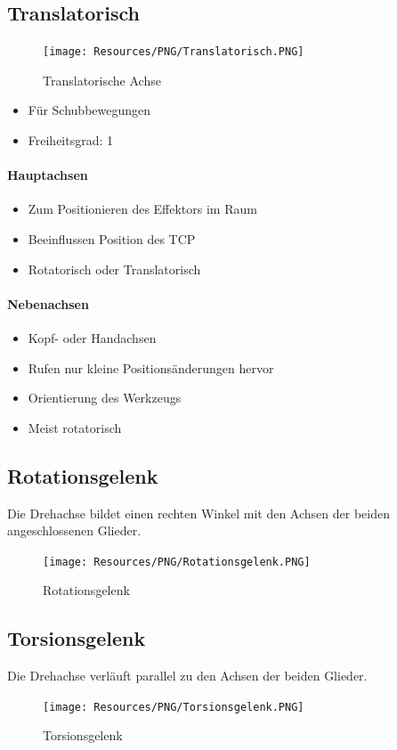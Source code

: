 \subsection{Translatorisch}
\begin{figure}[H]
	\begin{center}
		\texttt{[image: Resources/PNG/Translatorisch.PNG]}
		\caption{Translatorische Achse}
		\label{fig:PNG/Translatorisch.PNG}
	\end{center}
\end{figure}
\begin{itemize}
	\item Für Schubbewegungen
	\item Freiheitsgrad: 1
\end{itemize}
\paragraph{Hauptachsen}
\begin{itemize}
	\item Zum Positionieren des Effektors im Raum
	\item Beeinflussen Position des TCP
	\item Rotatorisch oder Translatorisch
\end{itemize}
\paragraph{Nebenachsen}
\begin{itemize}
	\item Kopf- oder Handachsen
	\item Rufen nur kleine Positionsänderungen hervor
	\item Orientierung des Werkzeugs
	\item Meist rotatorisch
\end{itemize}
\subsection{Rotationsgelenk}
Die Drehachse bildet einen rechten Winkel mit den Achsen der beiden angeschlossenen Glieder.
\begin{figure}[H]
	\begin{center}
		\texttt{[image: Resources/PNG/Rotationsgelenk.PNG]}
		\caption{Rotationsgelenk}
		\label{fig:Resources/PNG/Rotationsgelenk}
	\end{center}
\end{figure}
\subsection{Torsionsgelenk}
Die Drehachse verläuft parallel zu den Achsen der beiden Glieder.
\begin{figure}[H]
	\begin{center}
		\texttt{[image: Resources/PNG/Torsionsgelenk.PNG]}
		\caption{Torsionsgelenk}
		\label{fig:Resources/PNG/Torsionsgelenk}
	\end{center}
\end{figure}
